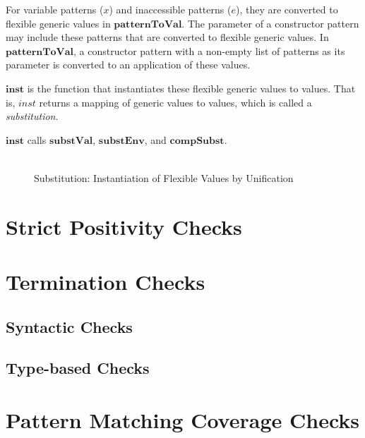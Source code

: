 \documentclass[acmsmall]{acmart}
\begin{document}
For variable patterns ($x$) and inaccessible patterns (\underline{$e$}), they are converted to flexible generic values in $\boldsymbol{patternToVal}$. The parameter of a constructor pattern may include these patterns that are converted to flexible generic values. In $\boldsymbol{patternToVal}$, a constructor pattern with a non-empty list of patterns as its parameter is converted to an application of these values.

$\boldsymbol{inst}$ is the function that instantiates these flexible generic values to values. That is, $inst$ returns a mapping of generic values to values, which is called a \emph{substitution}.

$\boldsymbol{inst}$ calls $\boldsymbol{substVal}$, $\boldsymbol{substEnv}$, and $\boldsymbol{compSubst}$. %

\begin{figure}[H]
  \begin{equation*}
    \begin{aligned}
    \end{aligned}
  \end{equation*}
  \caption{Substitution: Instantiation of Flexible Values by Unification}
\end{figure}

\section{Strict Positivity Checks}
\label{sec:spos}




\section{Termination Checks}
\label{sec:termination}

\subsection{Syntactic Checks}

\subsection{Type-based Checks}

\section{Pattern Matching Coverage Checks}
\label{sec:pattern}
\end{document}
